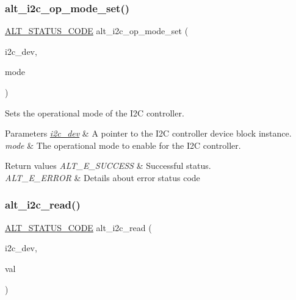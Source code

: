 \subsubsection{\texorpdfstring{alt\_i2c\_op\_mode\_set()}{alt\_i2c\_op\_mode\_set()}}
{\footnotesize\ttfamily \mbox{\hyperlink{hwlib_8h_abdb0d369f069723ca55d6c94bcaaaa12}{A\+L\+T\+\_\+\+S\+T\+A\+T\+U\+S\+\_\+\+C\+O\+DE}} alt\+\_\+i2c\+\_\+op\+\_\+mode\+\_\+set (\begin{DoxyParamCaption}\item[{\mbox{\hyperlink{structALT__I2C__DEV__s}{A\+L\+T\+\_\+\+I2\+C\+\_\+\+D\+E\+V\+\_\+t}} $\ast$}]{i2c\+\_\+dev,  }\item[{const \mbox{\hyperlink{group__ALT__I2C_ga15e9cb79693e43e74075112b2aebe1e2}{A\+L\+T\+\_\+\+I2\+C\+\_\+\+M\+O\+D\+E\+\_\+t}}}]{mode }\end{DoxyParamCaption})}

Sets the operational mode of the I2C controller.


\begin{DoxyParams}{Parameters}
{\em \mbox{\hyperlink{structi2c__dev}{i2c\+\_\+dev}}} & A pointer to the I2C controller device block instance.\\
\hline
{\em mode} & The operational mode to enable for the I2C controller.\\
\hline
\end{DoxyParams}

\begin{DoxyRetVals}{Return values}
{\em A\+L\+T\+\_\+\+E\+\_\+\+S\+U\+C\+C\+E\+SS} & Successful status. \\
\hline
{\em A\+L\+T\+\_\+\+E\+\_\+\+E\+R\+R\+OR} & Details about error status code \\
\hline
\end{DoxyRetVals}
\mbox{\label{group__ALT__I2C_ga4fef6676a5473f870bf441d29932239b}} 
\subsubsection{\texorpdfstring{alt\_i2c\_read()}{alt\_i2c\_read()}}
{\footnotesize\ttfamily \mbox{\hyperlink{hwlib_8h_abdb0d369f069723ca55d6c94bcaaaa12}{A\+L\+T\+\_\+\+S\+T\+A\+T\+U\+S\+\_\+\+C\+O\+DE}} alt\+\_\+i2c\+\_\+read (\begin{DoxyParamCaption}\item[{\mbox{\hyperlink{structALT__I2C__DEV__s}{A\+L\+T\+\_\+\+I2\+C\+\_\+\+D\+E\+V\+\_\+t}} $\ast$}]{i2c\+\_\+dev,  }\item[{uint8\+\_\+t $\ast$}]{val }\end{DoxyParamCaption})}

